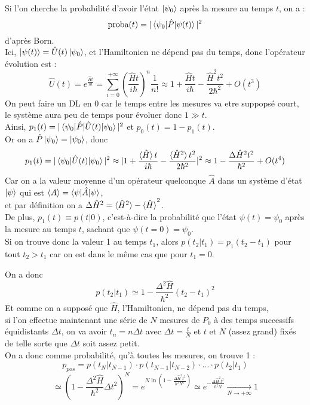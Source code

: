 \documentclass[11pt]{article}
\begin{document}
Si l'on cherche la probabilité d'avoir l'état $\ket{\psi_0}$ après la mesure au temps $t$, on a :
\[ \text{proba}(t) = | \braket{\psi_0|\hat P|\psi(t)} |^2 \] d'après Born.\\
Ici, $\ket{\psi(t)} = \hat U(t)\ket{\psi_0}$, et l'Hamiltonien ne dépend pas du temps, donc l'opérateur évolution est :
\[ \hat U(t) = e^{\frac{\hat H t}{i\hbar}} = \sum_{i=0}^{+\infty} (\frac{\hat H t}{i\hbar})^n \frac{1}{n!} \approx 1 + \frac{\hat H t}{i\hbar} - \frac{\hat H^2t^2}{2\hbar^2} + O(t^3) \]
On peut faire un DL en 0 car le temps entre les mesures va etre suppopsé court, le système aura peu de temps pour évoluer donc $1 \gg t$.\\
\vspace{0.2cm}
Ainsi, \qquad $p_1(t) = |\braket{\psi_0|\hat P|\hat U(t)|\psi_0}|^2$ \qquad et \qquad $p_0(t) = 1 - p_1(t)$.\\
\vspace{0.2cm}
Or on a $\hat P\ket{\psi_0} = \ket{\psi_0}$, donc
\[ p_1(t) = |\braket{\psi_0|\hat U(t)|\psi_0}|^2 \approx |1 + \frac{\braket{\hat H}t}{i\hbar} - \frac{\braket{\hat H^2}t^2}{2\hbar^2}|^2 \approx 1 - \frac{\Delta \hat H^2 t^2}{\hbar^2} + O(t^4) \]
Car on a la valeur moyenne d'un opérateur quelconque $\hat A$ dans un système d'état $\ket{\psi}$ qui est $\braket{A} = \braket{\psi|\hat A|\psi}$,\\
et par définition on a $\Delta \hat H^2 = \braket{\hat H^2} - \braket{\hat H}^2$.\\
\vspace{0.5cm}
De plus, $p_1(t) \equiv p(t|0)$, c'est-à-dire la probabilité que l'état $\psi(t) = \psi_0$ après la mesure au temps $t$, sachant que $\psi(t=0) = \psi_0$.\\
\vspace{0.3cm}
Si on trouve donc la valeur 1 au temps $t_1$, alors $p(t_2|t_1) = p_1(t_2-t_1)$ pour tout $t_2 > t_1$ car on est dans le même cas que pour $t_1 = 0$.

On a donc
\[ p(t_2|t_1) \simeq 1 - \frac{\Delta^2 \hat H}{\hbar^2}(t_2 - t_1)^2 \]
Et comme on a supposé que $\hat H$, l'Hamiltonien, ne dépend pas du temps, \\
si l'on effectue maintenant une série de $N$ mesures de $P_0$ à des temps successifs équidistants $\Delta t$, on va avoir $t_n = n \Delta t$ avec $\Delta t = \frac{t}{N}$ et $t$ et $N$ (assez grand) fixés de telle sorte que $\Delta t$ soit assez petit.\\
\vspace{0.3cm}
On a donc comme probabilité, qu'à toutes les mesures, on trouve 1 :
\[ p_{pos} = p(t_N|t_{N-1}) \cdot p(t_{N-1}|t_{N-2}) \cdot ... \cdot p(t_2|t_1) \]
\[ \simeq \left(1 - \frac{\Delta^2 \hat H}{\hbar^2}\Delta t^2\right)^N = e^{N \ln\left(1 - \frac{\Delta \hat H^2 t^2}{\hbar^2N^2}\right)} \simeq e^{-\frac{\Delta \hat H^2 t^2}{\hbar^2N}} \xrightarrow[N \rightarrow +\infty]{} 1 \]
\end{document}
